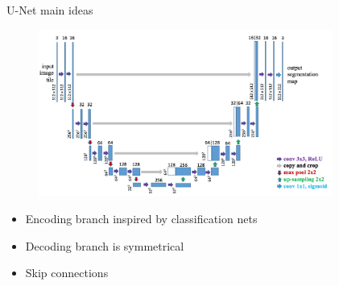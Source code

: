 \documentclass[xcolor=pdftex,dvipsnames,table,mathserif]{beamer}
\begin{document}

\begin{frame}{U-Net main ideas}

      \begin{figure}
        \includegraphics[width=0.86\textwidth]{unet_lo}
      \end{figure}


      \begin{itemize}
      \item Encoding branch inspired by classification nets
      \item Decoding branch is symmetrical
      \item Skip connections
      \end{itemize}

\end{frame}
\end{document}
